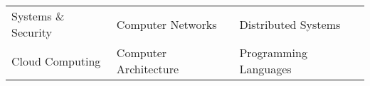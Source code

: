 
{\fontsize{9.5pt}{1.5em}\bodyfontlight\upshape\color{text}
  \setlength\extrarowheight{-3pt}
  \begin{tabular*}{\textwidth}{L{\textwidth/3} L{\textwidth/3} L{\textwidth/3}}
    Systems \& Security & Computer Networks & Distributed Systems \\
    Cloud Computing & Computer Architecture & Programming Languages
\end{tabular*}
\vspace{-1em}
}
